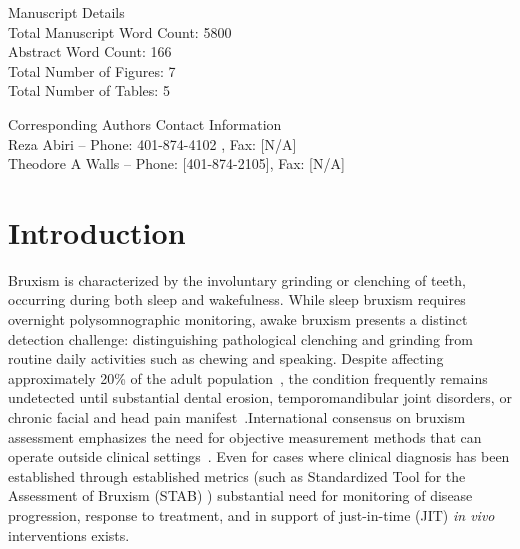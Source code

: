 \documentclass[pdflatex,sn-vancouver-num, iicol]{sn-jnl}
\begin{document}
\maketitle


\vspace{1em}
\noindent Manuscript Details \\
Total Manuscript Word Count: 5800 \\
Abstract Word Count: 166 \\
Total Number of Figures: 7 \\
Total Number of Tables: 5 

\vspace{1em}
\noindent Corresponding Authors Contact Information \\
Reza Abiri -- Phone: 401-874-4102 , Fax: [N/A] \\
Theodore A Walls -- Phone: [401-874-2105], Fax: [N/A]
\vspace{2em}





\newpage
\section{Introduction}

Bruxism is characterized by the involuntary grinding or clenching of teeth, occurring during both sleep and wakefulness. While sleep bruxism requires overnight polysomnographic monitoring, awake bruxism presents a distinct detection challenge: distinguishing pathological clenching and grinding from routine daily activities such as chewing and speaking. Despite affecting approximately 20\% of the adult population~\cite{manfredini2013epidemiology}, the condition frequently remains undetected until substantial dental erosion, temporomandibular joint disorders, or chronic facial and head pain manifest~\cite{lavigne2008bruxism}.International consensus on bruxism assessment emphasizes the need for objective measurement methods that can operate outside clinical settings~\cite{lobbezoo2018international}. Even for cases where clinical diagnosis has been established through established metrics (such as Standardized Tool for the Assessment of Bruxism (STAB) \cite{manfredini2024standardised})
substantial need for monitoring of disease progression, response to treatment, and in support of just-in-time (JIT) \textit{in vivo} interventions exists.
\end{document}

